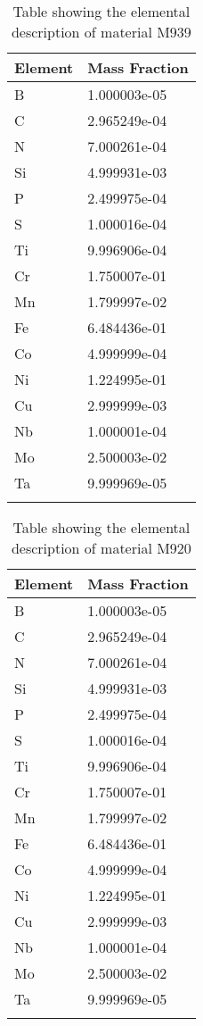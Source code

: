 \begin{centering}
\begin{longtable}[ht!]
{ p{} | p{} }
\hline
Element & Mass Fraction\\
\hline
B &  1.000003e-05\\
C &  2.965249e-04\\
N &  7.000261e-04\\
Si &  4.999931e-03\\
P &  2.499975e-04\\
S &  1.000016e-04\\
Ti &  9.996906e-04\\
Cr &  1.750007e-01\\
Mn &  1.799997e-02\\
Fe &  6.484436e-01\\
Co &  4.999999e-04\\
Ni &  1.224995e-01\\
Cu &  2.999999e-03\\
Nb &  1.000001e-04\\
Mo &  2.500003e-02\\
Ta &  9.999969e-05\\
\caption{Table showing the elemental description of material M939}
\label{table:material_EppWaterPipes}
\end{longtable}
\clearpage

\begin{longtable}[ht!]
{ p{} | p{} }
\hline
Element & Mass Fraction\\
\hline
B &  1.000003e-05\\
C &  2.965249e-04\\
N &  7.000261e-04\\
Si &  4.999931e-03\\
P &  2.499975e-04\\
S &  1.000016e-04\\
Ti &  9.996906e-04\\
Cr &  1.750007e-01\\
Mn &  1.799997e-02\\
Fe &  6.484436e-01\\
Co &  4.999999e-04\\
Ni &  1.224995e-01\\
Cu &  2.999999e-03\\
Nb &  1.000001e-04\\
Mo &  2.500003e-02\\
Ta &  9.999969e-05\\
\caption{Table showing the elemental description of material M920}
\label{table:material_EppDIagBox}
\end{longtable}
\clearpage


\end{centering}
